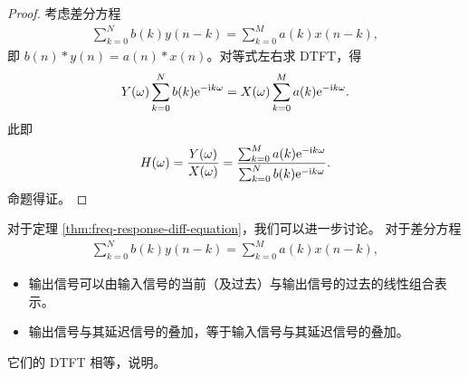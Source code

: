\begin{proof}
    考虑差分方程
    \begin{align*}
        \sum_{k = 0}^{N}b(k)y(n - k) = \sum_{k = 0}^{M}a(k)x(n - k),
    \end{align*}
    即 $b(n) * y(n) = a(n) * x(n)$。对等式左右求 DTFT，得
    \begin{align*}
        Y(\omega) \sum_{k = 0}^{N}b(k)\mathrm{e}^{-\mathrm{i} k\omega} = X(\omega)\sum_{k = 0}^{M}a(k)\mathrm{e}^{-\mathrm{i} k\omega}.
    \end{align*}
    此即
    \begin{align*}
        H(\omega) = \frac{Y(\omega)}{X(\omega)} = \frac{\sum_{k = 0}^{M}a(k)\mathrm{e}^{-\mathrm{i} k \omega}}{\sum_{k = 0}^{N}b(k)\mathrm{e}^{-\mathrm{i} k \omega}}.
    \end{align*}
    命题得证。
\end{proof}

\begin{remark}
    对于定理 \ref{thm:freq-response-diff-equation}，我们可以进一步讨论。
    对于差分方程
    \begin{align*}
        \sum_{k = 0}^{N}b(k)y(n - k) = \sum_{k = 0}^{M}a(k)x(n - k),
    \end{align*}
    \begin{itemize}
        \item 输出信号可以由输入信号的当前（及过去）与输出信号的过去的线性组合表示。
        \item 输出信号与其延迟信号的叠加，等于输入信号与其延迟信号的叠加。
    \end{itemize}
    它们的 DTFT 相等，说明。
\end{remark}

